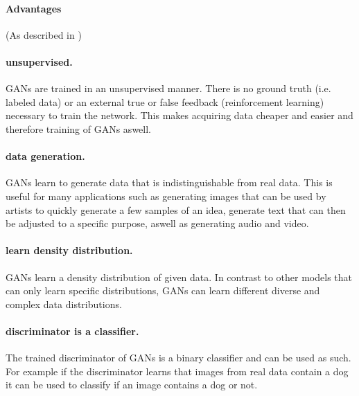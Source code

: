 \newpage

\paragraph{Advantages} (As described in \cite{GAN_Projects})
\paragraph{unsupervised.} GANs are trained in an unsupervised manner. There is no ground truth (i.e. labeled data) or an external true or false feedback (reinforcement learning) necessary to train the network. This makes acquiring data cheaper and easier and therefore training of GANs aswell. 

\paragraph{data generation.} GANs learn to generate data that is indistinguishable from real data. This is useful for many applications such as generating images that can be used by artists to quickly generate a few samples of an idea, generate text that can then be adjusted to a specific purpose, aswell as generating audio and video.

\paragraph{learn density distribution.} GANs learn a density distribution of given data. In contrast to other models that can only learn specific distributions, GANs can learn different diverse and complex data distributions.

\paragraph{discriminator is a classifier.} The trained discriminator of GANs is a binary classifier and can be used as such. For example if the discriminator learns that images from real data contain a dog it can be used to classify if an image contains a dog or not. 